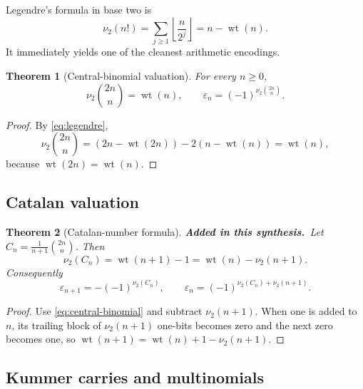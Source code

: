 \documentclass[11pt,oneside]{article}
\numberwithin{equation}{section}
\newtheorem{theorem}{Theorem}[section]
\theoremstyle{definition}
\theoremstyle{remark}
\newcommand{\wt}{\operatorname{wt}}
\newcommand{\vtwo}{\nu_2}
\newcommand{\eps}{\varepsilon}
\newcommand{\newmaterial}{\textcolor{AtlasBlue}{\textbf{Added in this synthesis.}}\ }
\begin{document}
Legendre's formula in base two is
\begin{equation}
 \vtwo(n!)=\sum_{j\ge1}\left\lfloor\frac n{2^j}\right\rfloor
          =n-\wt(n).
 \label{eq:legendre}
\end{equation}
It immediately yields one of the cleanest arithmetic encodings.

\begin{theorem}[Central-binomial valuation]
For every \(n\ge0\),
\begin{equation}
 \boxed{\vtwo\binom{2n}{n}=\wt(n),\qquad
 \eps_n=(-1)^{\vtwo\binom{2n}{n}}.}
 \label{eq:central-binomial}
\end{equation}
\end{theorem}

\begin{proof}
By \eqref{eq:legendre},
\[
 \vtwo\binom{2n}{n}
 =(2n-\wt(2n))-2(n-\wt(n))=\wt(n),
\]
because \(\wt(2n)=\wt(n)\).
\end{proof}

\subsection{Catalan valuation}

\begin{theorem}[Catalan-number formula]
\newmaterial Let \(C_n=\frac1{n+1}\binom{2n}{n}\).  Then
\begin{equation}
 \boxed{\vtwo(C_n)=\wt(n+1)-1
 =\wt(n)-\vtwo(n+1).}
 \label{eq:catalan-valuation}
\end{equation}
Consequently
\begin{equation}
 \eps_{n+1}=-(-1)^{\vtwo(C_n)},
 \qquad
 \eps_n=(-1)^{\vtwo(C_n)+\vtwo(n+1)}.
 \label{eq:catalan-thue-morse}
\end{equation}
\end{theorem}

\begin{proof}
Use \eqref{eq:central-binomial} and subtract \(\vtwo(n+1)\).  When one is
added to \(n\), its trailing block of \(\vtwo(n+1)\) one-bits becomes zero
and the next zero becomes one, so
\(\wt(n+1)=\wt(n)+1-\vtwo(n+1)\).
\end{proof}

\subsection{Kummer carries and multinomials}
\end{document}
